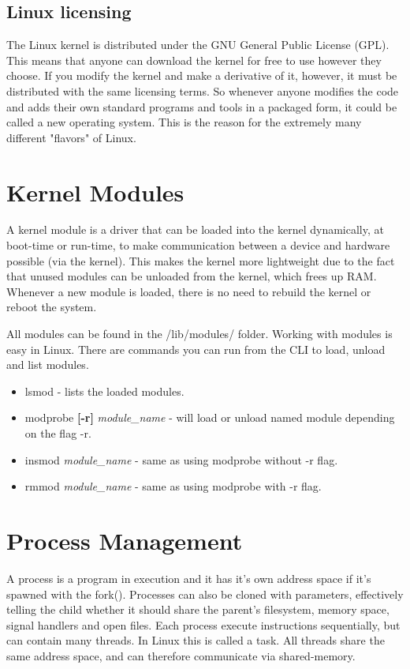 \documentclass[12pt]{article}
\begin{document}
\subsection{Linux licensing}
The Linux kernel is distributed under the GNU General Public License (GPL). 
This means that anyone can download the kernel for free to use however they choose.
If you modify the kernel and make a derivative of it, however, it must be distributed with the same licensing terms.
So whenever anyone modifies the code and adds their own standard programs and tools in a packaged form, it could be called a new operating system.
This is the reason for the extremely many different "flavors" of Linux.

\section{Kernel Modules} %
A kernel module is a driver that can be loaded into the kernel dynamically, at boot-time or run-time,
to make communication between a device and hardware possible (via the kernel).
This makes the kernel more lightweight due to the fact that unused modules can be unloaded from the kernel, which frees up RAM.
Whenever a new module is loaded, there is no need to rebuild the kernel or reboot the system.

All modules can be found in the /lib/modules/ folder.
Working with modules is easy in Linux. There are commands you can run from the CLI to load, unload and list modules.
\begin{itemize}
  \item lsmod - lists the loaded modules.
  \item modprobe \textbf{[-r]} \textit{module\_name} - will load or unload named module depending on the flag -r.
  \item insmod \textit{module\_name} - same as using modprobe without -r flag.
  \item rmmod \textit{module\_name} - same as using modprobe with -r flag.
\end{itemize}

\section{Process Management} %
A process is a program in execution and it has it's own address space if it's spawned with the fork().
Processes can also be cloned with parameters, effectively telling the child whether it should share the parent's filesystem, memory space, signal handlers and open files.
Each process execute instructions sequentially, but can contain many threads. In Linux this is called a task. 
All threads share the same address space, and can therefore communicate via shared-memory.
\end{document}
